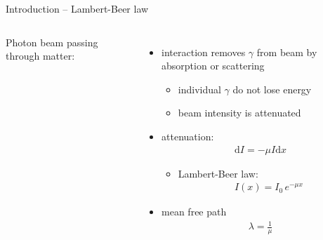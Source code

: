 \documentclass[11pt,xcolor=dvipsnames,professionalfonts]{beamer}
\begin{document}
\begin{frame}{Introduction -- Lambert-Beer law}
	\begin{columns}
		Photon beam passing through matter:
			\begin{itemize}
				\item interaction removes $\gamma$ from beam by absorption or scattering
				\begin{itemize}
					\item individual $\gamma$ do not lose energy
					\item beam intensity is attenuated
				\end{itemize}
				
				\item attenuation:
				\begin{align*}
					\mathrm{d} I = - \mu I \mathrm{d}x
				\end{align*}
				\begin{itemize}
					\item Lambert-Beer law:
					\begin{align*}
					I(x) = I_0 \, e^{-\mu x}
					\end{align*}
				\end{itemize}
				
				
				\item mean free path
				\begin{align*}
					\lambda = \frac{1}{\mu}
				\end{align*}
			\end{itemize}


\end{columns}
\end{frame}
\end{document}
